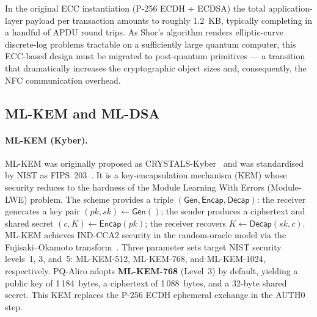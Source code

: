 \documentclass[runningheads]{llncs}
\begin{document}
{\sloppy
In the original ECC instantiation (P-256 ECDH + ECDSA) the total application-\allowbreak layer
payload per transaction amounts to roughly 1.2~KB, typically completing in a
handful of APDU round trips.  As Shor's algorithm renders elliptic-curve
discrete-log problems tractable on a sufficiently large quantum computer, this
ECC-based design must be migrated to post-quantum primitives --- a transition
that dramatically increases the cryptographic object sizes and, consequently,
the NFC communication overhead.
\par}


\subsection{ML-KEM and ML-DSA}
\label{sec:pqc}

\paragraph{ML-KEM (Kyber).}
{\sloppy
ML-KEM was originally proposed as CRYSTALS-Kyber~\cite{EuroSP:BDKLLSSSS18} and
was standardised by NIST as FIPS~203~\cite{NIST:FIPS203}.  It is a
key-encapsulation mechanism (KEM) whose security reduces to the hardness of the
Module Learning With Errors (Module-LWE) problem.  The scheme provides a triple
$(\mathsf{Gen}, \mathsf{Encap}, \mathsf{Decap})$: the receiver generates a key
pair $(\mathit{pk}, \mathit{sk}) \leftarrow \mathsf{Gen}()$; the sender
produces a ciphertext and shared secret $(c, K) \leftarrow \mathsf{Encap}(\mathit{pk})$;
the receiver recovers $K \leftarrow \mathsf{Decap}(\mathit{sk}, c)$.
ML-KEM achieves IND-CCA2 security in the random-oracle model via the Fujisaki--Okamoto transform~\cite{JC:FujOka13}.  Three parameter
sets target NIST security levels~1, 3, and~5:
ML-KEM-512, ML-KEM-768, and ML-KEM-1024, respectively.
PQ-Aliro adopts \textbf{ML-KEM-768} (Level~3) by default,
yielding a public key of 1\,184~bytes, a ciphertext of 1\,088~bytes, and a
32-byte shared secret.  This KEM replaces the P-256 ECDH ephemeral exchange
in the AUTH0 step.
\par}
\end{document}
